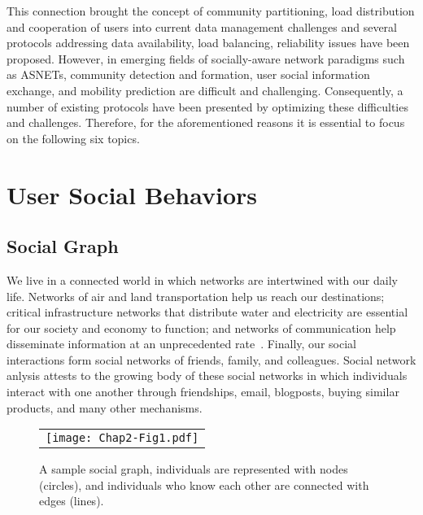 This connection brought the concept of community partitioning, load distribution and cooperation of users into current data management challenges and several protocols addressing data availability, load balancing, reliability issues have been proposed.  However, in emerging fields of socially-aware network paradigms such as ASNETs, community detection and formation, user social information exchange, and mobility prediction are difficult and challenging. Consequently, a number of existing protocols have been presented by optimizing these difficulties and challenges. Therefore, for the aforementioned reasons it is essential to focus on the following six topics.

\section{User Social Behaviors}\label{Chap2_01}

\subsection{Social Graph}\label{Chap2_01_01}
We live in a connected world in which networks are intertwined with our daily life. Networks of air and land transportation help us reach our destinations; critical infrastructure networks that distribute water and electricity are essential for our society and economy to function; and networks of communication help disseminate information at an unprecedented rate~\cite{RZafarani2014}. Finally, our social interactions form social networks of friends, family, and colleagues. Social network anlysis attests to the growing body of these social networks in which individuals interact with one another through friendships, email, blogposts, buying similar products, and many other mechanisms.
\begin{figure}[t]
\begin{center}
  \begin{tabular}{c}
  \texttt{[image: Chap2-Fig1.pdf]}
  \end{tabular}
  \caption{A sample social graph, individuals are represented with nodes (circles), and individuals who know each other are connected with edges (lines).}
\end{center}
\end{figure}

